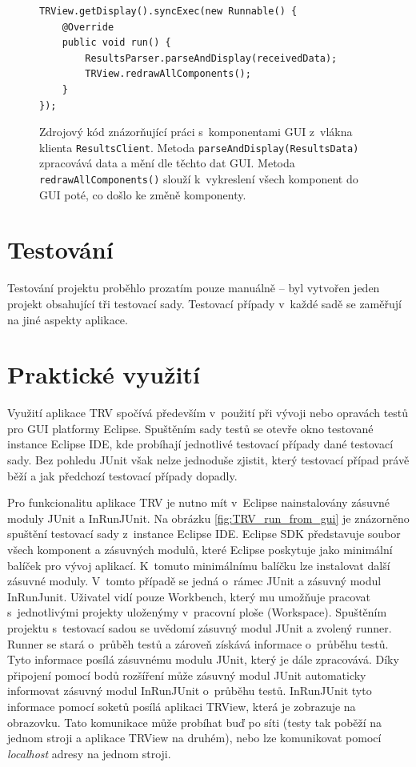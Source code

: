       	\lstset{language=java}
	\begin{figure}
	  \begin{lstlisting}[frame=single]
TRView.getDisplay().syncExec(new Runnable() {
	@Override
	public void run() {
		ResultsParser.parseAndDisplay(receivedData);
		TRView.redrawAllComponents();
	}
});
	  \end{lstlisting}
	  \caption{Zdrojový kód znázorňující práci s~komponentami GUI z~vlákna klienta \texttt{ResultsClient}. Metoda \texttt{parseAndDisplay(ResultsData)} zpracovává data a mění dle těchto dat GUI. Metoda \texttt{redrawAllComponents()} slouží k~vykreslení všech komponent do GUI poté, co došlo ke změně komponenty.}
	  \label{code:syncExec}
	\end{figure}
      
      
      
  \section{Testování}
  Testování projektu proběhlo prozatím pouze manuálně -- byl vytvořen jeden projekt obsahující tři testovací sady. Testovací případy v~každé sadě se zaměřují na jiné aspekty aplikace. 

  \section{Praktické využití}
  Využití aplikace TRV spočívá především v~použití při vývoji nebo opravách testů pro GUI platformy Eclipse. Spuštěním sady testů se otevře okno testované instance Eclipse IDE, kde probíhají jednotlivé testovací případy dané testovací sady. Bez pohledu JUnit však nelze jednoduše zjistit, který testovací případ právě běží a jak předchozí testovací případy dopadly.
  
  Pro funkcionalitu aplikace TRV je nutno mít v~Eclipse nainstalovány zásuvné moduly JUnit a InRunJUnit. Na obrázku \ref{fig:TRV_run_from_gui} je znázorněno spuštění testovací sady z~instance Eclipse IDE. Eclipse SDK představuje soubor všech komponent a zásuvných modulů, které Eclipse poskytuje jako minimální balíček pro vývoj aplikací. K~tomuto minimálnímu balíčku lze instalovat další zásuvné moduly. V~tomto případě se jedná o~rámec JUnit a zásuvný modul InRunJunit. Uživatel vidí pouze Workbench, který mu umožňuje pracovat s~jednotlivými projekty uloženýmy v~pracovní ploše (Workspace). Spuštěním projektu s~testovací sadou se uvědomí zásuvný modul JUnit a zvolený runner. Runner se stará o~průběh testů a zároveň získává informace o~průběhu testů. Tyto informace posílá zásuvnému modulu JUnit, který je dále zpracovává. Díky připojení pomocí bodů rozšíření může zásuvný modul JUnit automaticky informovat zásuvný modul InRunJUnit o~průběhu testů. InRunJUnit tyto informace pomocí soketů posílá aplikaci TRView, která je zobrazuje na obrazovku. Tato komunikace může probíhat buď po síti (testy tak poběží na jednom stroji a aplikace TRView na druhém), nebo lze komunikovat pomocí \emph{localhost} adresy na jednom stroji.
      
